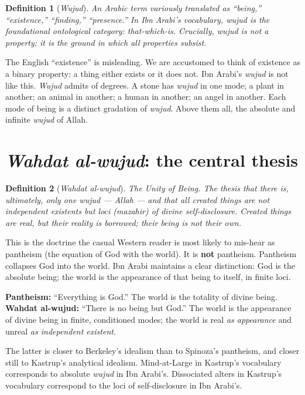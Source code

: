 \documentclass[11pt,a4paper]{book}
\theoremstyle{cleanrm}
\newtheorem{definition}{Definition}[chapter]
\begin{document}
\begin{definition}[\emph{Wujud}]
An Arabic term variously translated as ``being,'' ``existence,''
``finding,'' ``presence.'' In Ibn Arabi's vocabulary, \emph{wujud} is
the foundational ontological category: that-which-is. Crucially,
\emph{wujud} is not a property; it is the ground in which all
properties subsist.
\end{definition}

The English ``existence'' is misleading. We are accustomed to think
of existence as a binary property: a thing either exists or it does
not. Ibn Arabi's \emph{wujud} is not like this. \emph{Wujud} admits
of degrees. A stone has \emph{wujud} in one mode; a plant in another;
an animal in another; a human in another; an angel in another. Each
mode of being is a distinct gradation of \emph{wujud}. Above them all,
the absolute and infinite \emph{wujud} of Allah.

\section{\emph{Wahdat al-wujud}: the central thesis}

\begin{definition}[\emph{Wahdat al-wujud}]
The Unity of Being. The thesis that there is, ultimately, only one
\emph{wujud} --- Allah --- and that all created things are not
independent existents but \emph{loci} (\emph{mazahir}) of divine
self-disclosure. Created things are real, but their reality is
borrowed; their being is not their own.
\end{definition}

This is the doctrine the casual Western reader is most likely to
mis-hear as pantheism (the equation of God with the world). It is
\textbf{not} pantheism. Pantheism collapses God into the world. Ibn
Arabi maintains a clear distinction: God is the absolute being; the
world is the appearance of that being to itself, in finite loci.

\begin{conceptbox}
\textbf{Pantheism:} ``Everything is God.'' The world is the totality
of divine being.\\
\textbf{Wahdat al-wujud:} ``There is no being but God.'' The world is
the appearance of divine being in finite, conditioned modes; the world
is real \emph{as appearance} and unreal \emph{as independent
existent}.
\end{conceptbox}

The latter is closer to Berkeley's idealism than to Spinoza's
pantheism, and closer still to Kastrup's analytical idealism.
Mind-at-Large in Kastrup's vocabulary corresponds to absolute
\emph{wujud} in Ibn Arabi's. Dissociated alters in Kastrup's
vocabulary correspond to the loci of self-disclosure in Ibn Arabi's.
\end{document}
